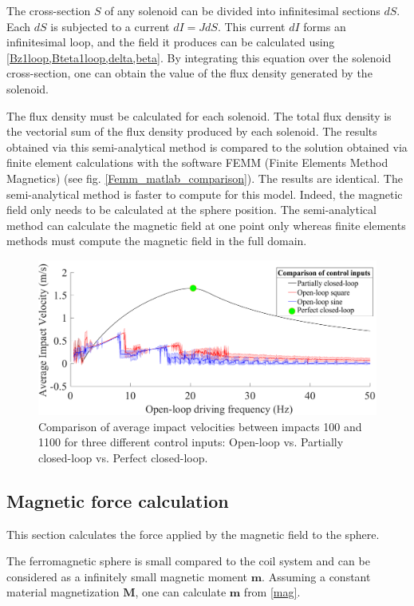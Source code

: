 \documentclass[letterpaper, 10 pt, conference]{ieeeconf}  %
\begin{document}
The cross-section $S$ of any solenoid can be divided into infinitesimal sections $dS$. Each $dS$ is subjected to a current $dI=JdS$. This current $dI$ forms an infinitesimal loop, and the field it produces can be calculated using \cref{Bz1loop,Bteta1loop,delta,beta}. By integrating this equation over the solenoid cross-section, one can obtain the value of the flux density generated by the solenoid.\par
The flux density must be calculated for each solenoid. The total flux density is the vectorial sum of the flux density produced by each solenoid. The results obtained via this semi-analytical method is compared to the solution obtained via finite element calculations with the software FEMM (Finite Elements Method Magnetics)\cite{femm} (see fig. \ref{Femm_matlab_comparison}). The results are identical. The semi-analytical method is faster to compute for this model. Indeed, the magnetic field only needs to be calculated at the sphere position. The semi-analytical method can calculate the magnetic field at one point only whereas finite elements methods must compute the magnetic field in the full domain.

\begin{figure}
	\includegraphics[width=\linewidth]{ComparisonOfControlInputs.pdf}
	\caption[Comparison of impact velocities from three control inputs]{Comparison of average impact velocities between impacts 100 and 1100 for three different control inputs: Open-loop vs. Partially closed-loop vs. Perfect closed-loop.}
	\label{CLvsOL}
\end{figure}
\subsection{Magnetic force calculation}
\label{magforce}

This section calculates the force applied by the magnetic field to the sphere.\par
The ferromagnetic sphere is small compared to the coil system and can be considered as a infinitely small magnetic moment $\mathbf{m}$. Assuming a constant material magnetization $\mathbf{M}$, one can calculate $\mathbf{m}$ from \cref{mag}.
\end{document}
